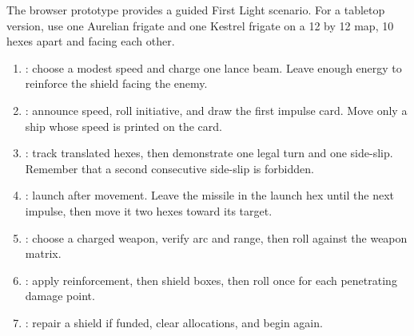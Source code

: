 The browser prototype provides a guided First Light scenario. For a tabletop version, use one Aurelian frigate and one Kestrel frigate on a 12 by 12 map, 10 hexes apart and facing each other.

\begin{enumerate}
  \item {}: choose a modest speed and charge one lance beam. Leave enough energy to reinforce the shield facing the enemy.
  \item {}: announce speed, roll initiative, and draw the first impulse card. Move only a ship whose speed is printed on the card.
  \item {}: track translated hexes, then demonstrate one legal turn and one side-slip. Remember that a second consecutive side-slip is forbidden.
  \item {}: launch after movement. Leave the missile in the launch hex until the next impulse, then move it two hexes toward its target.
  \item {}: choose a charged weapon, verify arc and range, then roll against the weapon matrix.
  \item {}: apply reinforcement, then shield boxes, then roll once for each penetrating damage point.
  \item {}: repair a shield if funded, clear allocations, and begin again.
\end{enumerate}
